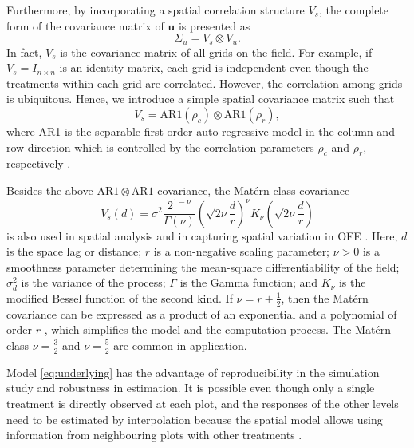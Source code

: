 \documentclass[a4paper]{article} 	%
\newcommand{\Matern}{Mat\'ern }
\newcommand{\AR}{\mathrm{AR1}}
\begin{document}
Furthermore, by incorporating a spatial correlation structure $V_s$, the complete form of the covariance matrix of $\bm{u}$ is presented as 
\begin{equation}\label{eq:varu}
	\Sigma_u = V_s \otimes V_u. 
\end{equation}
In fact, $V_s$ is the covariance matrix of all grids on the field. For example, if $V_s=I_{n\times n}$ is an identity matrix, each grid is independent even though the treatments within each grid are correlated. However, the correlation among grids is ubiquitous. Hence, we introduce a simple spatial covariance matrix such that 
\begin{equation}\label{eq:ar1cov}
	V_s = \AR(\rho_c)\otimes \AR(\rho_r),
\end{equation}
where AR1 is the separable first-order auto-regressive model in the column and row direction which is controlled by the correlation parameters $\rho_c$ and $\rho_r$, respectively \parencite{Butler2017ASRemlR}. 

Besides the above $\AR\otimes\AR$ covariance, the \Matern class covariance  
\begin{equation}\label{eq:matcov}
V_s(d) = \sigma^2 \frac{2^{1-\nu}}{\Gamma(\nu)} \left( \sqrt{2\nu} \frac{d}{r}\right)^\nu K_\nu\left( \sqrt{2\nu} \frac{d}{r}\right)
\end{equation}
is also used in spatial analysis \parencite{Cressie1999Classes} and in capturing spatial variation in OFE \parencite{Selle2019Flexible}. Here, $d$ is the space lag or distance; $r$ is a non-negative scaling parameter; $\nu> 0$ is a smoothness parameter determining the mean-square differentiability of the field; $\sigma_d^2$ is the variance of the process; $\Gamma$ is the Gamma function; and $K_\nu$ is the modified Bessel function of the second kind. If $\nu = r + \frac{1}{2}$, then the \Matern covariance can be expressed as a product of an exponential and a polynomial of order $r$ \parencite{Pandit2019Comparative, Abramowitz1974Handbook}, which simplifies the model and the computation process. The \Matern class $\nu=\frac{3}{2}$ and $\nu =\frac{5}{2}$ are common in application. 




Model \eqref{eq:underlying} has the advantage of reproducibility in the simulation study and robustness in estimation. It is possible even though only a single treatment is directly observed at each plot, and the responses of the other levels need to be estimated by interpolation because the spatial model allows using information from neighbouring plots with other treatments \parencite{Panten2010Enhancing, Piepho2011Statistical}. 
\end{document}
